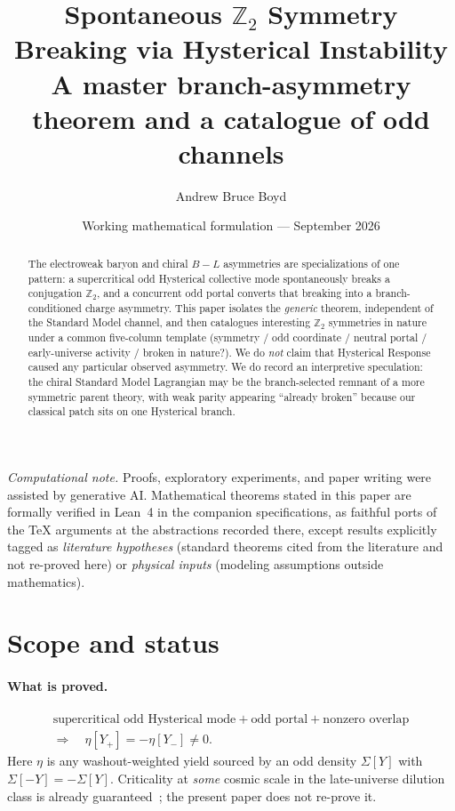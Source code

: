 \documentclass[11pt]{article}
\title{\textbf{Spontaneous $\mathbb Z_2$ Symmetry Breaking via Hysterical Instability}\\[0.35em]
\large A master branch-asymmetry theorem and a catalogue of odd channels}
\author{Andrew Bruce Boyd}
\date{Working mathematical formulation --- September 2026}
\theoremstyle{definition}
\theoremstyle{remark}
\begin{document}
\maketitle
\noindent\textit{Computational note.}
Proofs, exploratory experiments, and paper writing were assisted by generative AI.
Mathematical theorems stated in this paper are formally verified in Lean~4 in the
companion specifications, as faithful ports of the TeX arguments at the abstractions
recorded there, except results explicitly tagged as \emph{literature hypotheses}
(standard theorems cited from the literature and not re-proved here) or
\emph{physical inputs} (modeling assumptions outside mathematics).

\begin{abstract}
The electroweak baryon and chiral $B\!-\!L$ asymmetries are specializations of one pattern: a supercritical
odd Hysterical collective mode spontaneously breaks a conjugation
$\mathbb Z_2$, and a concurrent odd portal converts that breaking into a
branch-conditioned charge asymmetry.
This paper isolates the \emph{generic} theorem, independent of the Standard Model
channel, and then catalogues interesting $\mathbb Z_2$ symmetries in nature under
a common five-column template
(symmetry / odd coordinate / neutral portal / early-universe activity /
broken in nature?).
We do \emph{not} claim that Hysterical Response caused any particular observed
asymmetry.
We do record an interpretive speculation: the chiral Standard Model Lagrangian
may be the branch-selected remnant of a more symmetric parent theory, with
weak parity appearing ``already broken'' because our classical patch sits on one
Hysterical branch.
\end{abstract}
\tableofcontents
\newpage

\section{Scope and status}
\label{sec:scope}
\paragraph{What is proved.}
\begin{equation}
\label{eq:target}
\boxed{\begin{gathered}
\text{supercritical odd Hysterical mode}+
\text{odd portal}+
\text{nonzero overlap}\\
\Longrightarrow\quad
\eta[Y_+]=-\eta[Y_-]\neq0.
\end{gathered}}
\end{equation}
Here $\eta$ is any washout-weighted yield sourced by an odd density
$\Sigma[Y]$ with $\Sigma[-Y]=-\Sigma[Y]$.
Criticality at \emph{some} cosmic scale in the late-universe dilution class is
already guaranteed~\cite{boyd2026late}; the present paper does not re-prove it.
\end{document}
